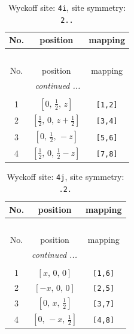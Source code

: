 \documentclass[fleqn,8pt]{jsarticle}
\begin{document}
\renewcommand{\arraystretch}{1.2}
\begin{longtable}{ccc}
\caption{Wyckoff site: {\tt 4i}, site symmetry: {\tt 2..}}
 \\
 \hline \hline
No. & position & mapping \\ \hline \endfirsthead

\multicolumn{2}{l}{\tablename\ \thetable{}} \\
 \hline \hline
No. & position & mapping \\ \hline \endhead

 \hline \hline
\multicolumn{2}{r}{\footnotesize\it continued ...} \\ \endfoot

 \hline \hline
\multicolumn{2}{r}{} \\ \endlastfoot

1 & $\left[ 0,\, \frac{1}{2},\, z \right]$ & {\tt [1,2]} \\ \hline
2 & $\left[ \frac{1}{2},\, 0,\, z + \frac{1}{2} \right]$ & {\tt [3,4]} \\ \hline
3 & $\left[ 0,\, \frac{1}{2},\, - z \right]$ & {\tt [5,6]} \\ \hline
4 & $\left[ \frac{1}{2},\, 0,\, \frac{1}{2} - z \right]$ & {\tt [7,8]} \\
\end{longtable}
\renewcommand{\arraystretch}{1.2}
\begin{longtable}{ccc}
\caption{Wyckoff site: {\tt 4j}, site symmetry: {\tt .2.}}
 \\
 \hline \hline
No. & position & mapping \\ \hline \endfirsthead

\multicolumn{2}{l}{\tablename\ \thetable{}} \\
 \hline \hline
No. & position & mapping \\ \hline \endhead

 \hline \hline
\multicolumn{2}{r}{\footnotesize\it continued ...} \\ \endfoot

 \hline \hline
\multicolumn{2}{r}{} \\ \endlastfoot

1 & $\left[ x,\, 0,\, 0 \right]$ & {\tt [1,6]} \\ \hline
2 & $\left[ - x,\, 0,\, 0 \right]$ & {\tt [2,5]} \\ \hline
3 & $\left[ 0,\, x,\, \frac{1}{2} \right]$ & {\tt [3,7]} \\ \hline
4 & $\left[ 0,\, - x,\, \frac{1}{2} \right]$ & {\tt [4,8]} \\
\end{longtable}
\end{document}

